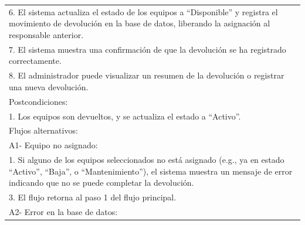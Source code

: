 \documentclass[stu, 12pt, letterpaper, donotrepeattitle, floatsintext, natbib]{apa7}
\begin{document}
\begin{longtable}{@{} p{16.5cm} @{}}
    6. El sistema actualiza el estado de los equipos a ``Disponible'' y registra el movimiento de devoluci\'on en la base de datos, liberando la asignaci\'on al responsable anterior.                                                   \\
    7. El sistema muestra una confirmaci\'on de que la devoluci\'on se ha registrado correctamente.                                                                                                                                      \\
    8. El administrador puede visualizar un resumen de la devoluci\'on o registrar una nueva devoluci\'on.                                                                                                                               \\ \midrule
    Postcondiciones:                                                                                                                                                                                                                     \\
    1. Los equipos son devueltos, y se actualiza el estado a ``Activo''.                                                                                                                                                                 \\ \midrule
    Flujos alternativos:                                                                                                                                                                                                                 \\
    A1- Equipo no asignado:                                                                                                                                                                                                              \\
    \hspace{1cm}1. Si alguno de los equipos seleccionados no est\'a asignado (e.g., ya en estado ``Activo'', ``Baja'', o ``Mantenimiento''), el sistema muestra un mensaje de error indicando que no se puede completar la devoluci\'on. \\
    \hspace{1cm}3. El flujo retorna al paso 1 del flujo principal.                                                                                                                                                                       \\
    A2- Error en la base de datos:                                                                                                                                                                                                       \\

\end{longtable}
\end{document}

